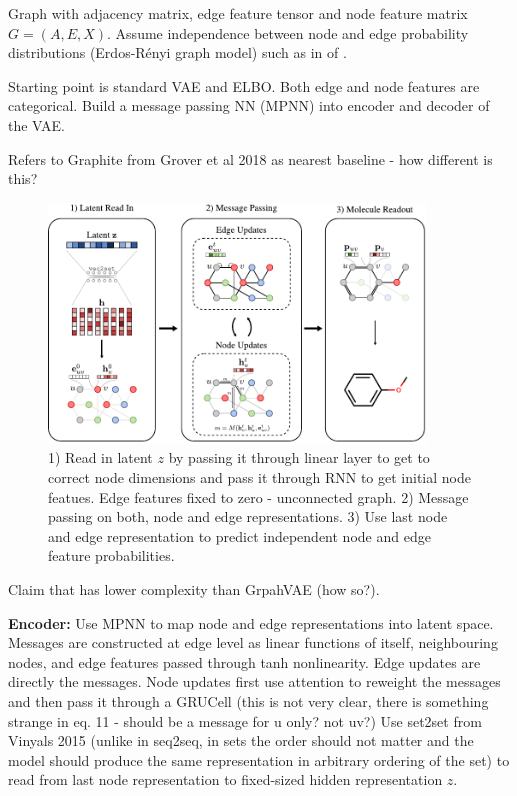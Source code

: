 Graph with adjacency matrix, edge feature tensor and node feature matrix $G = (A, E, X)$.
Assume independence between node and edge probability distributions (Erdos-R\'enyi graph model) such as in  of \textcite{simonovsky_graphvae_2018}.

Starting point is standard VAE and ELBO. Both edge and node features are categorical.
Build a message passing NN (MPNN) into encoder and decoder of the VAE.

Refers to Graphite from Grover et al 2018 as nearest baseline - how different is this?

\begin{figure}[ht]
\centering
\includegraphics[width=10cm]{mpgvae_figure1.png}
\caption{1) Read in latent $z$ by passing it through linear layer to get to correct node dimensions and pass it through RNN to get initial node featues. Edge features fixed to zero - unconnected graph. 2) Message passing on both, node and edge representations. 3) Use last node and edge representation to predict independent node and edge feature probabilities.}
\end{figure}

Claim that has lower complexity than GrpahVAE (how so?).

\textbf{Encoder:} Use MPNN to map node and edge representations into latent space.
Messages are constructed at edge level as linear functions of itself, neighbouring nodes, and edge features passed through tanh nonlinearity.
Edge updates are directly the messages. 
Node updates first use attention to reweight the messages and then pass it through a GRUCell (this is not very clear, there is something strange in eq. 11 - should be a message for u only? not uv?)
Use set2set from Vinyals 2015 (unlike in seq2seq, in sets the order should not matter and the model should produce the same representation in arbitrary ordering of the set) to read from last node representation to fixed-sized hidden representation $z$.

